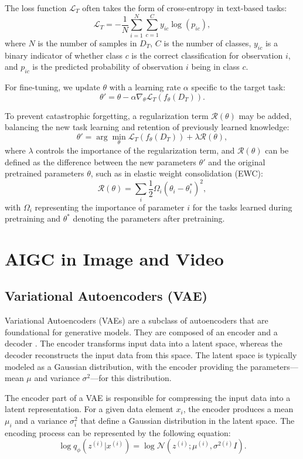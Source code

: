 \documentclass[11pt,a4paper,oneside]{report}
\begin{document}
The loss function \(\mathcal{L}_{T}\) often takes the form of cross-entropy in text-based tasks:
\[
\mathcal{L}_{T} = -\frac{1}{N}\sum_{i=1}^{N}\sum_{c=1}^{C} y_{ic}\log(p_{ic}),
\]
where \(N\) is the number of samples in \(D_{T}\), \(C\) is the number of classes, \(y_{ic}\) is a binary indicator of whether class \(c\) is the correct classification for observation \(i\), and \(p_{ic}\) is the predicted probability of observation \(i\) being in class \(c\).

For fine-tuning, we update \(\theta\) with a learning rate \(\alpha\) specific to the target task:
\[
\theta' = \theta - \alpha \nabla_{\theta} \mathcal{L}_{T}(f_{\theta}(D_{T})).
\]

To prevent catastrophic forgetting, a regularization term \(\mathcal{R}(\theta)\) may be added, balancing the new task learning and retention of previously learned knowledge:
\[
\theta' = \arg\min_{\theta} \mathcal{L}_{T}(f_{\theta}(D_{T})) + \lambda \mathcal{R}(\theta),
\]
where \(\lambda\) controls the importance of the regularization term, and \(\mathcal{R}(\theta)\) can be defined as the difference between the new parameters \(\theta'\) and the original pretrained parameters \(\theta\), such as in elastic weight consolidation (EWC):
\[
\mathcal{R}(\theta) = \sum_{i} \frac{1}{2} \Omega_{i} (\theta_{i} - \theta_{i}^{*})^2,
\]
with \(\Omega_{i}\) representing the importance of parameter \(i\) for the tasks learned during pretraining and \(\theta^{*}\) denoting the parameters after pretraining.


\section{AIGC in Image and Video}

\subsection{Variational Autoencoders (VAE)}

Variational Autoencoders (VAEs) are a subclass of autoencoders that are foundational for generative models. They are composed of an encoder and a decoder \cite{cho2014properties}. The encoder transforms input data into a latent space, whereas the decoder reconstructs the input data from this space. The latent space is typically modeled as a Gaussian distribution, with the encoder providing the parameters—mean $\mu$ and variance $\sigma^2$—for this distribution.

The encoder part of a VAE is responsible for compressing the input data into a latent representation. For a given data element $x_i$, the encoder produces a mean $\mu_i$ and a variance $\sigma^2_i$ that define a Gaussian distribution in the latent space. The encoding process can be represented by the following equation:
\begin{equation}
\log q_{\phi} \left( z^{(i)} | x^{(i)} \right) = \log \mathcal{N} \left( z^{(i)}; \mu^{(i)}, \sigma^{2(i)} I \right).
\end{equation}
\end{document}
